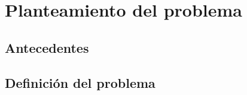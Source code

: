 \section{Planteamiento del problema}
\subsection{Antecedentes}\label{sec:Ant}



\subsection{Definición del problema}
